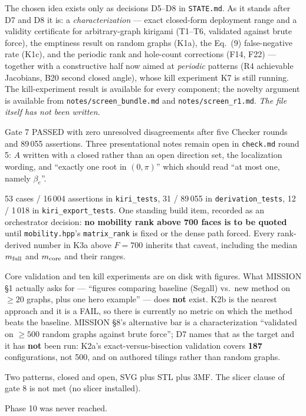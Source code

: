 \documentclass[10pt,a4paper]{article}
\newcommand{\fn}[1]{\nolinkurl{#1}}
\begin{document}
\begin{description}[leftmargin=6mm,style=nextline]
\item[1. \fn{IDEA.md} --- absent.] The chosen idea exists only as decisions D5--D8 in
\fn{STATE.md}. As it stands after D7 and D8 it is: a \emph{characterization} --- exact
closed-form deployment range and a validity certificate for arbitrary-graph kirigami (T1--T6,
validated against brute force), the emptiness result on random graphs (K1a), the Eq.~(9)
false-negative rate (K1c), and the periodic rank and hole-count corrections (F14, F22) ---
together with a constructive half now aimed at \emph{periodic} patterns (R4 achievable
Jacobians, B20 second closed angle), whose kill experiment K7 is still running.
The kill-experiment result is available for every component; the novelty argument is available
from \fn{notes/screen_bundle.md} and \fn{notes/screen_r1.md}. \emph{The file itself has not been
written.}

\item[2. \fn{derivations/core.md} --- present and checked.] Gate 7 PASSED with zero unresolved
disagreements after five Checker rounds and 89\,055 assertions. Three presentational notes
remain open in \fn{check.md} round 5: $A$ written with a closed rather than an open direction
set, the localization wording, and ``exactly one root in $(0,\pi)$'' which should read ``at most
one, namely $\beta_e$''.

\item[3. \fn{code/} --- present, tests passing.] 53 cases / 16\,004 assertions in
\fn{kiri_tests}, 31 / 89\,055 in \fn{derivation_tests}, 12 / 1\,018 in \fn{kiri_export_tests}.
One standing build item, recorded as an orchestrator decision: \textbf{no mobility rank above
700 faces is to be quoted} until \fn{mobility.hpp}'s \fn{matrix_rank} is fixed or the dense path
forced. Every rank-derived number in K3a above $F = 700$ inherits that caveat, including the
median $m_{\rm full}$ and $m_{\rm core}$ and their ranges.

\item[4. \fn{results/} --- partial.] Core validation and ten kill experiments are on disk with
figures. What MISSION \S1 actually asks for --- ``figures comparing baseline (Segall) vs.\ new
method on $\ge20$ graphs, plus one hero example'' --- does \textbf{not} exist. K2b is the nearest
approach and it is a FAIL, so there is currently no metric on which the method beats the
baseline. MISSION \S8's alternative bar is a characterization ``validated on $\ge500$ random
graphs against brute force''; D7 names that as the target and it has \textbf{not} been run:
K2a's exact-versus-bisection validation covers \textbf{187} configurations, not 500, and on
authored tilings rather than random graphs.

\item[5. \fn{export/} --- present.] Two patterns, closed and open, SVG plus STL plus 3MF. The
slicer clause of gate 8 is not met (no slicer installed).

\item[6. \fn{REPORT.md} --- absent.] Phase 10 was never reached.
\end{description}
\end{document}
